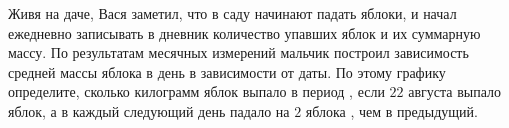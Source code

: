 Живя на даче, Вася заметил, что в саду начинают падать яблоки, и  начал ежедневно записывать в дневник количество упавших яблок и их суммарную массу. По результатам месячных измерений мальчик построил зависимость средней массы яблока в день в зависимости от даты. По этому графику определите, сколько килограмм яблок выпало в период , если $22$ августа выпало  яблок, а в каждый следующий день падало на $2$ яблока , чем в предыдущий.
